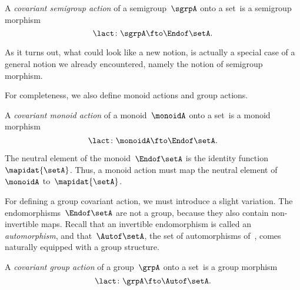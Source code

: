 \begin{ctdefinition}
    \label{def:semigroup-cov-action}
    A \emph{covariant semigroup action} of a semigroup~$\sgrpA$ onto a set~\setA is a semigroup morphism
    \begin{equation}
        \label{eq:act-semigroup}
        \lact \colon \sgrpA \fto \Endof\setA.
    \end{equation}
\end{ctdefinition}

As it turns out, what could look like a new notion, is actually a special case of a general notion we already encountered, namely the notion of semigroup morphism.

For completeness, we also define monoid actions and group actions.

\begin{ctdefinition}
    \label{def:monoid-cov-action}
    A \emph{covariant monoid action} of a monoid~$\monoidA$ onto a set~\setA is a monoid morphism
    \begin{equation}
        \label{eq:act-monoid}
        \lact \colon \monoidA \fto \Endof\setA.
    \end{equation}
\end{ctdefinition}

The neutral element of the monoid~$\Endof\setA$ is the identity function~$\mapidat{\setA}$.
Thus, a monoid action must map the neutral element of~$\monoidA$ to~$\mapidat{\setA}$.
%

For defining a group covariant action, we must introduce a slight variation.
The endomorphisms~$\Endof\setA$ are not a group, because they also contain non-invertible maps.
Recall that an invertible endomorphism is called an \emph{automorphism}, and that~$\Autof\setA$, the set of automorphisms of~\setA, comes naturally equipped with a group structure.


\begin{ctdefinition}
    \label{def:group-cov-action}
    A \emph{covariant group action} of a group~$\grpA$ onto a set~\setA is a group morphism
    \begin{equation}
        \label{eq:act-group}
        \lact \colon \grpA \fto \Autof\setA.
    \end{equation}
\end{ctdefinition}

